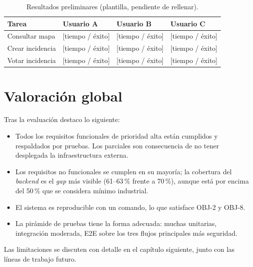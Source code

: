 
\begin{table}[H]
\centering
\caption{Resultados preliminares (plantilla, pendiente de rellenar).}
\label{tab:usabilidad}
\small
\begin{tabular}{@{}L{3cm}L{3cm}L{3cm}L{3cm}@{}}
\toprule
\textbf{Tarea} & \textbf{Usuario A} & \textbf{Usuario B} & \textbf{Usuario C} \\
\midrule
Consultar mapa  & [tiempo / éxito] & [tiempo / éxito] & [tiempo / éxito] \\
Crear incidencia & [tiempo / éxito] & [tiempo / éxito] & [tiempo / éxito] \\
Votar incidencia & [tiempo / éxito] & [tiempo / éxito] & [tiempo / éxito] \\
\bottomrule
\end{tabular}
\end{table}


\section{Valoración global}
\label{sec:valoracion-global}

Tras la evaluación destaco lo siguiente:

\begin{itemize}[leftmargin=1.2cm, itemsep=2pt]
  \item Todos los requisitos funcionales de prioridad alta están cumplidos y respaldados por pruebas. Los parciales son consecuencia de no tener desplegada la infraestructura externa.
  \item Los requisitos no funcionales se cumplen en su mayoría; la cobertura del \textit{backend} es el \textit{gap} más visible (61--63\,\% frente a 70\,\%), aunque está por encima del 50\,\% que se considera mínimo industrial.
  \item El sistema es reproducible con un comando, lo que satisface OBJ-2 y OBJ-8.
  \item La pirámide de pruebas tiene la forma adecuada: muchas unitarias, integración moderada, E2E sobre los tres flujos principales más seguridad.
\end{itemize}

Las limitaciones se discuten con detalle en el capítulo siguiente, junto con las líneas de trabajo futuro.
